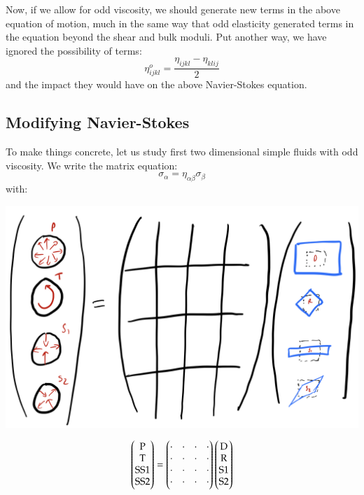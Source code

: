Now, if we allow for odd viscosity, we should generate new terms in the above equation of motion, much in the same way that odd elasticity generated terms in the equation beyond the shear and bulk moduli. Put another way, we have ignored the possibility of terms:
\begin{equation}
    \eta^o_{ijkl} = \frac{\eta_{ijkl} - \eta_{klij}}{2}
\end{equation}
and the impact they would have on the above Navier-Stokes equation.

\subsection{Modifying Navier-Stokes}
To make things concrete, let us study first two dimensional simple fluids with odd viscosity. We write the matrix equation:
\begin{equation}
    \sigma_\alpha = \eta_{\alpha\beta}\sigma_\beta
\end{equation}
with:
\begin{center}
    \includegraphics[scale=0.3]{Lectures/Images/lec2-stiffnessmatrix.png}
\end{center}
\begin{equation}
    \begin{pmatrix}\text{P} \\ \text{T} \\ \text{SS1} \\ \text{SS2}\end{pmatrix} = \begin{pmatrix}\cdot & \cdot & \cdot & \cdot \\ \cdot & \cdot & \cdot & \cdot \\ \cdot & \cdot & \cdot & \cdot \\ \cdot & \cdot & \cdot & \cdot\end{pmatrix}\begin{pmatrix}\text{D} \\ \text{R} \\ \text{S1} \\ \text{S2}\end{pmatrix}
\end{equation}
